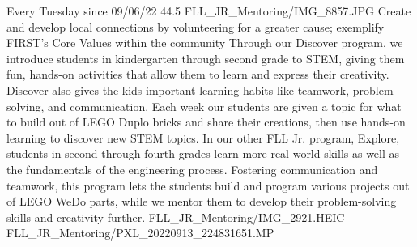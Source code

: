 {Every Tuesday since 09/06/22}
{44.5}
{FLL_JR_Mentoring/IMG_8857.JPG}
{Create and develop local connections by volunteering for a greater cause; exemplify FIRST's Core Values within the community} 
{Through our Discover program, we introduce students in kindergarten through second grade to STEM, giving them fun, hands-on activities that allow them to learn and express their creativity. Discover also gives the kids important learning habits like teamwork, problem-solving, and communication. Each week our students are given a topic for what to build out of LEGO Duplo bricks and share their creations, then use hands-on learning to discover new STEM topics. In our other FLL Jr. program, Explore, students in second through fourth grades learn more real-world skills as well as the fundamentals of the engineering process. Fostering communication and teamwork, this program lets the students build and program various projects out of LEGO WeDo parts, while we mentor them to develop their problem-solving skills and creativity further.
} 
{FLL_JR_Mentoring/IMG_2921.HEIC}
{FLL_JR_Mentoring/PXL_20220913_224831651.MP}
